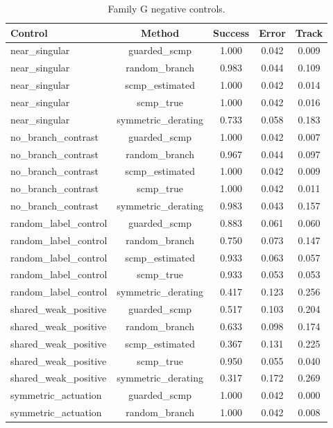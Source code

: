 \begin{table}[t]
\centering
\small
\caption{Family G negative controls.}
\label{tab:negative-controls}
\begin{tabular}{lcccc}
\toprule
Control & Method & Success & Error & Track \\
\midrule
near\_singular & guarded\_scmp & 1.000 & 0.042 & 0.009 \\
near\_singular & random\_branch & 0.983 & 0.044 & 0.109 \\
near\_singular & scmp\_estimated & 1.000 & 0.042 & 0.014 \\
near\_singular & scmp\_true & 1.000 & 0.042 & 0.016 \\
near\_singular & symmetric\_derating & 0.733 & 0.058 & 0.183 \\
no\_branch\_contrast & guarded\_scmp & 1.000 & 0.042 & 0.007 \\
no\_branch\_contrast & random\_branch & 0.967 & 0.044 & 0.097 \\
no\_branch\_contrast & scmp\_estimated & 1.000 & 0.042 & 0.009 \\
no\_branch\_contrast & scmp\_true & 1.000 & 0.042 & 0.011 \\
no\_branch\_contrast & symmetric\_derating & 0.983 & 0.043 & 0.157 \\
random\_label\_control & guarded\_scmp & 0.883 & 0.061 & 0.060 \\
random\_label\_control & random\_branch & 0.750 & 0.073 & 0.147 \\
random\_label\_control & scmp\_estimated & 0.933 & 0.063 & 0.057 \\
random\_label\_control & scmp\_true & 0.933 & 0.053 & 0.053 \\
random\_label\_control & symmetric\_derating & 0.417 & 0.123 & 0.256 \\
shared\_weak\_positive & guarded\_scmp & 0.517 & 0.103 & 0.204 \\
shared\_weak\_positive & random\_branch & 0.633 & 0.098 & 0.174 \\
shared\_weak\_positive & scmp\_estimated & 0.367 & 0.131 & 0.225 \\
shared\_weak\_positive & scmp\_true & 0.950 & 0.055 & 0.040 \\
shared\_weak\_positive & symmetric\_derating & 0.317 & 0.172 & 0.269 \\
symmetric\_actuation & guarded\_scmp & 1.000 & 0.042 & 0.000 \\
symmetric\_actuation & random\_branch & 1.000 & 0.042 & 0.008 \\

\end{tabular}
\end{table}
